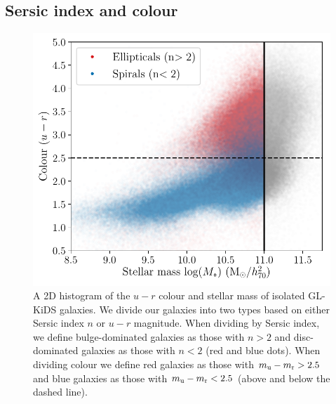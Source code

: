 \documentclass[usenatbib]{mnras}
\newcommand{\un}[1]{_{\rm #1}}
\begin{document}
\subsection{Sersic index and colour}
\label{sec:results-types}

\begin{figure}
	\includegraphics[width=\columnwidth]{Figures/galaxy_morphology_color_u-r.pdf}
	\caption{A 2D histogram of the $u-r$ colour and stellar mass of isolated GL-KiDS galaxies. We divide our galaxies into two types based on either Sersic index $n$ or $u-r$ magnitude. When dividing by Sersic index, we define bulge-dominated galaxies as those with $n>2$ and disc-dominated galaxies as those with $n<2$ (red and blue dots). When dividing colour we define red galaxies as those with $m\un{u} - m\un{r} > 2.5$ and blue galaxies as those with $m\un{u} - m\un{r} < 2.5$ (above and below the dashed line).}
	\label{fig:galtypes_scatterplot}
\end{figure}
\end{document}
